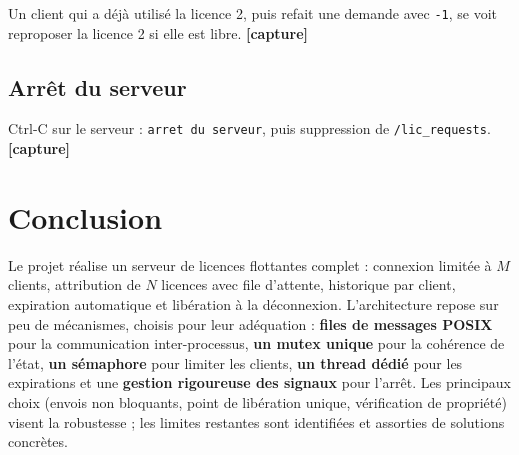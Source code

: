 \documentclass[11pt,a4paper]{article}
\newcommand{\code}[1]{\texttt{#1}}
\begin{document}
Un client qui a déjà utilisé la licence 2, puis refait une demande avec \code{-1}, se voit reproposer la licence 2 si elle est libre. \textbf{[capture]}

\subsection{Arrêt du serveur}

Ctrl-C sur le serveur : \code{arret du serveur}, puis suppression de \code{/lic\_requests}. \textbf{[capture]}

\section{Conclusion}

Le projet réalise un serveur de licences flottantes complet : connexion limitée à $M$ clients, attribution de $N$ licences avec file d'attente, historique par client, expiration automatique et libération à la déconnexion. L'architecture repose sur peu de mécanismes, choisis pour leur adéquation : \textbf{files de messages POSIX} pour la communication inter-processus, \textbf{un mutex unique} pour la cohérence de l'état, \textbf{un sémaphore} pour limiter les clients, \textbf{un thread dédié} pour les expirations et une \textbf{gestion rigoureuse des signaux} pour l'arrêt. Les principaux choix (envois non bloquants, point de libération unique, vérification de propriété) visent la robustesse ; les limites restantes sont identifiées et assorties de solutions concrètes.
\end{document}
